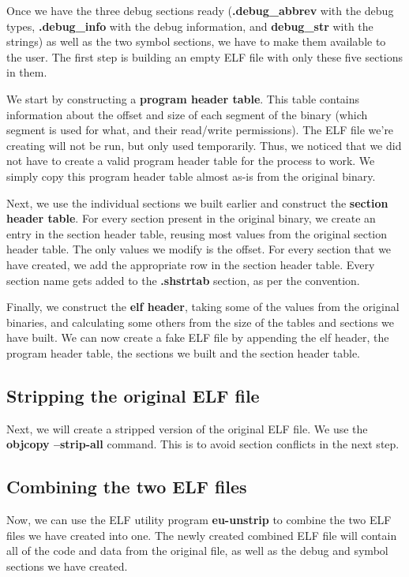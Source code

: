 \documentclass[a4paper,11pt,oneside]{report}
\begin{document}
Once we have the three debug sections ready
(\textbf{.debug\_abbrev} with the debug types, \textbf{.debug\_info} with the debug information, and \textbf{debug\_str} with the strings)
as well as the two symbol sections, we have to make them available to the user.
The first step is building an empty ELF file with only these five sections in them.

We start by constructing a \textbf{program header table}.
This table contains information about the offset and size of each segment of the binary (which segment is used for what, and their read/write permissions).
The ELF file we're creating will not be run, but only used temporarily.
Thus, we noticed that we did not have to create a valid program header table for the process to work.
We simply copy this program header table almost as-is from the original binary.

Next, we use the individual sections we built earlier and construct the \textbf{section header table}.
For every section present in the original binary, we create an entry in the section header table, reusing most values from the original section header table.
The only values we modify is the offset.
For every section that we have created, we add the appropriate row in the section header table.
Every section name gets added to the \textbf{.shstrtab} section, as per the convention.

Finally, we construct the \textbf{elf header}, taking some of the values from the original binaries, and calculating some others from the size of the tables and sections we have built.
We can now create a fake ELF file by appending the elf header, the program header table, the sections we built and the section header table.

\subsection{Stripping the original ELF file}

Next, we will create a stripped version of the original ELF file.
We use the \textbf{objcopy --strip-all} command.
This is to avoid section conflicts in the next step.

\subsection{Combining the two ELF files}

Now, we can use the ELF utility program \textbf{eu-unstrip} to combine the two ELF files we have created into one.
The newly created combined ELF file will contain all of the code and data from the original file, as well as the debug and symbol sections we have created.
\end{document}
